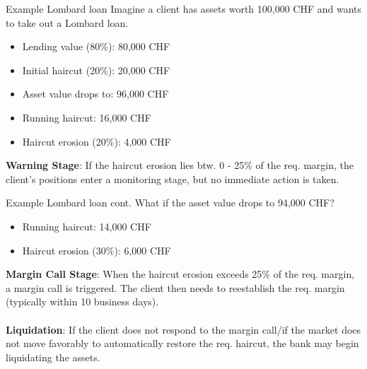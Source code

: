 \documentclass[compress, 10pt, notes]{beamer}  %
\begin{document}
\begin{frame}[fragile]{Example Lombard loan}
    Imagine a client has assets worth 100,000 CHF and wants to take out a Lombard loan.
    \begin{itemize}
        \pause
        \item Lending value (80\%): 80,000 CHF
        \pause
        \item Initial haircut (20\%): 20,000 CHF
        \pause
        \item Asset value drops to: 96,000 CHF
        \pause
        \item Running haircut: 16,000 CHF
        \pause
        \item Haircut erosion (20\%): 4,000 CHF
        \pause
    \end{itemize}
    \textbf{Warning Stage}: If the haircut erosion lies btw. 0 - 25\% of the req. margin, the client's positions enter a monitoring stage, but no immediate action is taken.
\end{frame}


\begin{frame}[fragile]{Example Lombard loan cont.}
    What if the asset value drops to 94,000 CHF?
    \begin{itemize}
        \pause
        \item Running haircut: 14,000 CHF
        \pause
        \item Haircut erosion (30\%): 6,000 CHF
        \pause
    \end{itemize}
    \textcolor<5>{bg!85!normal text.fg}{\textbf{Margin Call Stage}: When the haircut erosion exceeds 25\% of the req. margin, a margin call is triggered. The client then needs to reestablish the req. margin (typically within 10 business days).} \\~\\
    \pause 
    \textbf{Liquidation}: If the client does not respond to the margin call/if the market does not move favorably to automatically restore the req. haircut, the bank may begin liquidating the assets.
\end{frame}
\end{document}
